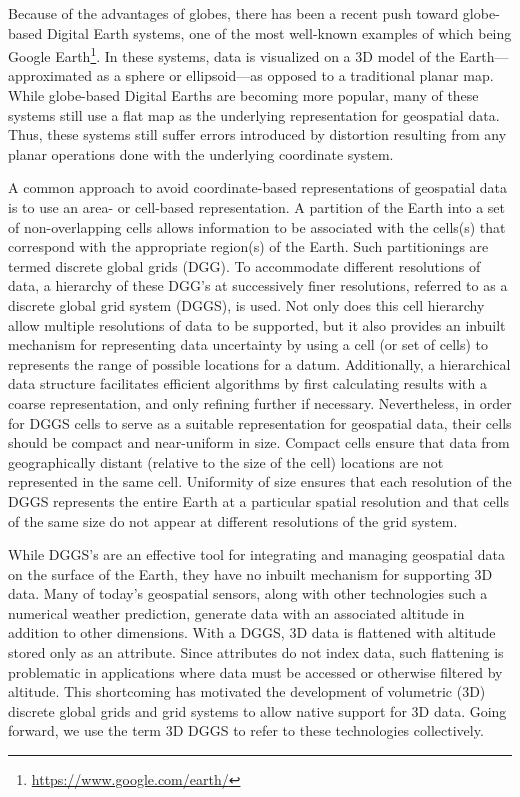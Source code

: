 Because of the advantages of globes, there has been a recent push toward globe-based Digital Earth systems, one of the most well-known examples of which being Google Earth\footnote{\url{https://www.google.com/earth/}}.
In these systems, data is visualized on a 3D model of the Earth---approximated as a sphere or ellipsoid---as opposed to a traditional planar map.
While globe-based Digital Earths are becoming more popular, many of these systems still use a flat map as the underlying representation for geospatial data.
Thus, these systems still suffer errors introduced by distortion resulting from any planar operations done with the underlying coordinate system.


A common approach to avoid coordinate-based representations of geospatial data is to use an area- or cell-based representation.
A partition of the Earth into a set of non-overlapping cells allows information to be associated with the cells(s) that correspond with the appropriate region(s) of the Earth.
Such partitionings are termed discrete global grids (DGG).
To accommodate different resolutions of data, a hierarchy of these DGG's at successively finer resolutions, referred to as a discrete global grid system (DGGS), is used.
Not only does this cell hierarchy allow multiple resolutions of data to be supported, but it also provides an inbuilt mechanism for representing data uncertainty by using a cell (or set of cells) to represents the range of possible locations for a datum.
Additionally, a hierarchical data structure facilitates efficient algorithms by first calculating results with a coarse representation, and only refining further if necessary.
Nevertheless, in order for DGGS cells to serve as a suitable representation for geospatial data, their cells should be compact and near-uniform in size.
Compact cells ensure that data from geographically distant (relative to the size of the cell) locations are not represented in the same cell.
Uniformity of size ensures that each resolution of the DGGS represents the entire Earth at a particular spatial resolution and that cells of the same size do not appear at different resolutions of the grid system.


While DGGS's are an effective tool for integrating and managing geospatial data on the surface of the Earth, they have no inbuilt mechanism for supporting 3D data.
Many of today's geospatial sensors, along with other technologies such a numerical weather prediction, generate data with an associated altitude in addition to other dimensions.
With a DGGS, 3D data is flattened with altitude stored only as an attribute.
Since attributes do not index data, such flattening is problematic in applications where data must be accessed or otherwise filtered by altitude.
This shortcoming has motivated the development of volumetric (3D) discrete global grids and grid systems to allow native support for 3D data.
Going forward, we use the term 3D DGGS to refer to these technologies collectively.



